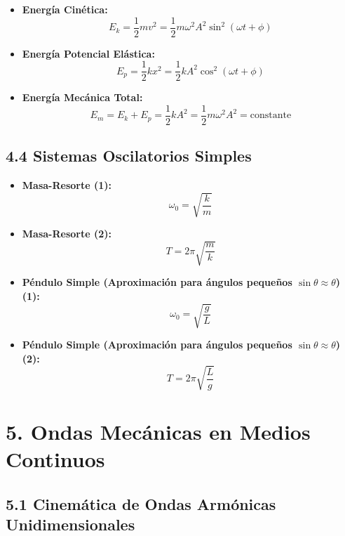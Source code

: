 \documentclass[11pt,a4paper]{article}
\begin{document}
\begin{itemize}
  \item \textbf{Energía Cinética:}
  \[
    E_k = \frac{1}{2} m v^2 = \frac{1}{2} m \omega^2 A^2 \sin^2(\omega t + \phi)
  \]
  \item \textbf{Energía Potencial Elástica:}
  \[
    E_p = \frac{1}{2} k x^2 = \frac{1}{2} k A^2 \cos^2(\omega t + \phi)
  \]
  \item \textbf{Energía Mecánica Total:}
  \[
    E_m = E_k + E_p = \frac{1}{2} k A^2 = \frac{1}{2} m \omega^2 A^2 = \text{constante}
  \]
\end{itemize}

\subsection*{4.4 Sistemas Oscilatorios Simples}

\begin{itemize}
  \item \textbf{Masa-Resorte (1):}
  \[
    \omega_0 = \sqrt{\frac{k}{m}}
  \]
  \item \textbf{Masa-Resorte (2):}
  \[
    T = 2\pi\sqrt{\frac{m}{k}}
  \]
  \item \textbf{Péndulo Simple (Aproximación para ángulos pequeños $\sin\theta \approx \theta$) (1):}
  \[
    \omega_0 = \sqrt{\frac{g}{L}}
  \]
  \item \textbf{Péndulo Simple (Aproximación para ángulos pequeños $\sin\theta \approx \theta$) (2):}
  \[
    T = 2\pi\sqrt{\frac{L}{g}}
  \]
\end{itemize}

\section*{5. Ondas Mecánicas en Medios Continuos}

\subsection*{5.1 Cinemática de Ondas Armónicas Unidimensionales}
\end{document}
